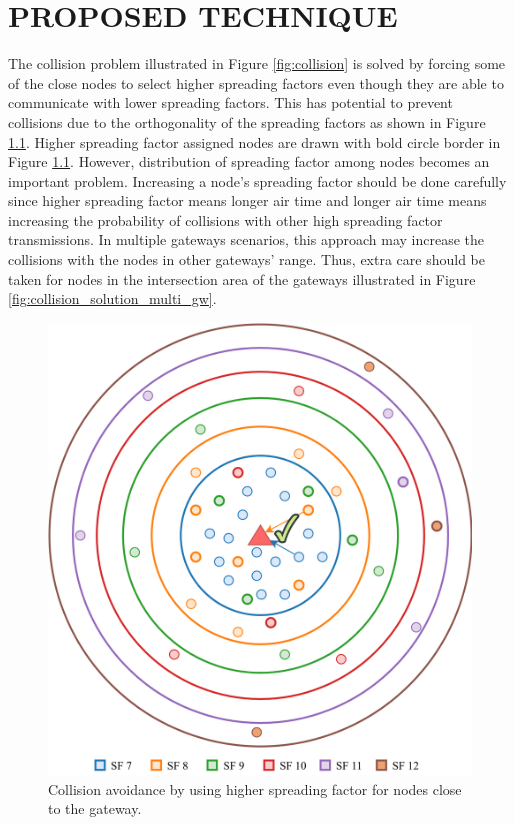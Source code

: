 \chapter{PROPOSED TECHNIQUE}\label{ch:proposed_technique}

The collision problem illustrated in Figure \ref{fig:collision} is solved by forcing some of the close nodes to select higher spreading factors even though they are able to communicate with lower spreading factors. This has potential to prevent collisions due to the orthogonality of the spreading factors as shown in Figure \ref{fig:collision_solution_single_gw}. Higher spreading factor assigned nodes are drawn with bold circle border in Figure \ref{fig:collision_solution_single_gw}. However, distribution of spreading factor among nodes becomes an important problem. Increasing a node's spreading factor should be done carefully since higher spreading factor means longer air time and longer air time means increasing the probability of collisions with other high spreading factor transmissions. In multiple gateways scenarios, this approach may increase the collisions with the nodes in other gateways' range. Thus, extra care should be taken for nodes in the intersection area of the gateways illustrated in Figure \ref{fig:collision_solution_multi_gw}.

\begin{figure}
\centering
\includegraphics[width=.7\linewidth]{fig/lora_single_gw_collision_fix.png}
\vspace*{5mm}
\caption{Collision avoidance by using higher spreading factor for nodes close to the gateway.}
\label{fig:collision_solution_single_gw}
\end{figure}

